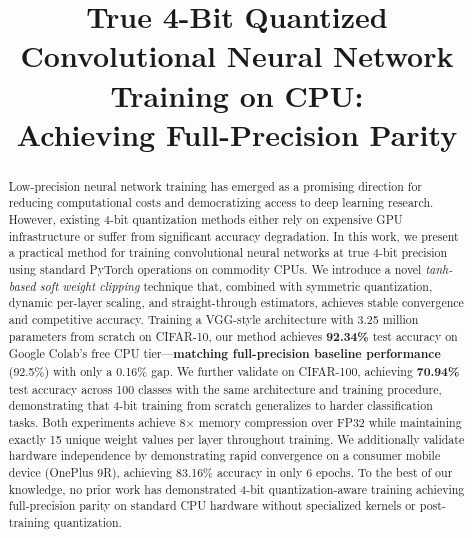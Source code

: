 \documentclass[conference]{IEEEtran}
\begin{document}
\title{True 4-Bit Quantized Convolutional Neural Network Training on CPU: \\Achieving Full-Precision Parity}

\author{
}

\maketitle

\begin{abstract}
Low-precision neural network training has emerged as a promising direction for reducing computational costs and democratizing access to deep learning research. However, existing 4-bit quantization methods either rely on expensive GPU infrastructure or suffer from significant accuracy degradation. In this work, we present a practical method for training convolutional neural networks at true 4-bit precision using standard PyTorch operations on commodity CPUs. We introduce a novel \textit{tanh-based soft weight clipping} technique that, combined with symmetric quantization, dynamic per-layer scaling, and straight-through estimators, achieves stable convergence and competitive accuracy. Training a VGG-style architecture with 3.25 million parameters from scratch on CIFAR-10, our method achieves \textbf{92.34\%} test accuracy on Google Colab's free CPU tier---\textbf{matching full-precision baseline performance} (92.5\%) with only a 0.16\% gap. We further validate on CIFAR-100, achieving \textbf{70.94\%} test accuracy across 100 classes with the same architecture and training procedure, demonstrating that 4-bit training from scratch generalizes to harder classification tasks. Both experiments achieve 8$\times$ memory compression over FP32 while maintaining exactly 15 unique weight values per layer throughout training. We additionally validate hardware independence by demonstrating rapid convergence on a consumer mobile device (OnePlus 9R), achieving 83.16\% accuracy in only 6 epochs. To the best of our knowledge, no prior work has demonstrated 4-bit quantization-aware training achieving full-precision parity on standard CPU hardware without specialized kernels or post-training quantization.
\end{abstract}
\end{document}
